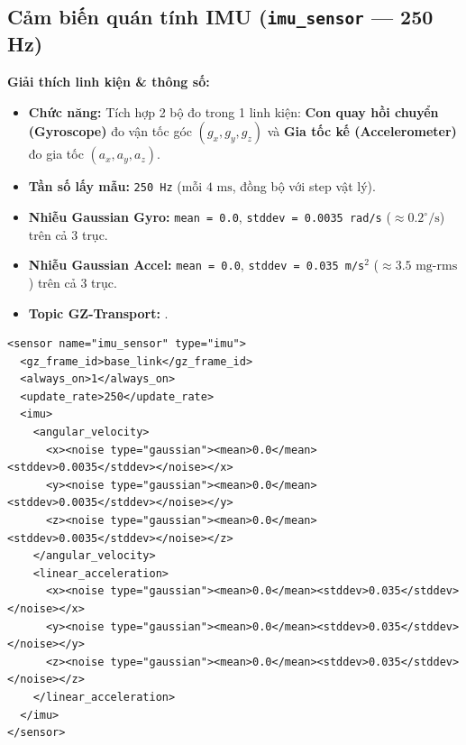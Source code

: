 \documentclass[11pt,a4paper]{article}
\begin{document}
\subsection{Cảm biến quán tính IMU (\texttt{imu\_sensor} — 250 Hz)}
\noindent
\begin{minipage}[t]{0.45\textwidth}
\vspace{0pt}
\textbf{Giải thích linh kiện \& thông số:}
\begin{itemize}
    \item \textbf{Chức năng:} Tích hợp 2 bộ đo trong 1 linh kiện: \textbf{Con quay hồi chuyển (Gyroscope)} đo vận tốc góc $(g_x, g_y, g_z)$ và \textbf{Gia tốc kế (Accelerometer)} đo gia tốc $(a_x, a_y, a_z)$.
    \item \textbf{Tần số lấy mẫu:} \texttt{250 Hz} (mỗi $4\text{ ms}$, đồng bộ với step vật lý).
    \item \textbf{Nhiễu Gaussian Gyro:} \texttt{mean = 0.0}, \texttt{stddev = 0.0035 rad/s} ($\approx 0.2^\circ/\text{s}$) trên cả 3 trục.
    \item \textbf{Nhiễu Gaussian Accel:} \texttt{mean = 0.0}, \texttt{stddev = 0.035 m/s$^2$} ($\approx 3.5\text{ mg-rms}$) trên cả 3 trục.
    \item \textbf{Topic GZ-Transport:} .
\end{itemize}
\end{minipage}
\hfill
\begin{minipage}[t]{0.52\textwidth}
\vspace{0pt}
\begin{lstlisting}[language=SDF, firstnumber=255]
<sensor name="imu_sensor" type="imu">
  <gz_frame_id>base_link</gz_frame_id>
  <always_on>1</always_on>
  <update_rate>250</update_rate>
  <imu>
    <angular_velocity>
      <x><noise type="gaussian"><mean>0.0</mean><stddev>0.0035</stddev></noise></x>
      <y><noise type="gaussian"><mean>0.0</mean><stddev>0.0035</stddev></noise></y>
      <z><noise type="gaussian"><mean>0.0</mean><stddev>0.0035</stddev></noise></z>
    </angular_velocity>
    <linear_acceleration>
      <x><noise type="gaussian"><mean>0.0</mean><stddev>0.035</stddev></noise></x>
      <y><noise type="gaussian"><mean>0.0</mean><stddev>0.035</stddev></noise></y>
      <z><noise type="gaussian"><mean>0.0</mean><stddev>0.035</stddev></noise></z>
    </linear_acceleration>
  </imu>
</sensor>
\end{lstlisting}
\end{minipage}
\end{document}
